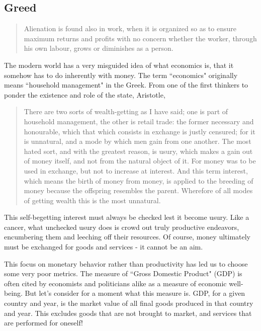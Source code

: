 \documentclass[letterpaper]{article}
\begin{document}
\subsection{Greed}

\begin{quote}
  Alienation is found also in work, when it is organized so as to ensure maximum returns and profits with no concern whether the worker, through his own labour, grows or diminishes as a person.
\end{quote}

The modern world has a very misguided idea of what economics is, that it somehow has to do inherently with money. The term ``economics" originally means ``household management" in the Greek. From one of the first thinkers to ponder the existence and role of the state, Aristotle,

\begin{quote}
  There are two sorts of wealth-getting as I have said; one is part of household management, the other is retail trade: the former necessary and honourable, which that which consists in exchange is justly censured; for it is unnatural, and a mode by which men gain from one another. The most hated sort, and with the greatest reason, is usury, which makes a gain out of money itself, and not from the natural object of it. For money was to be used in exchange, but not to increase at interest. And this term interest, which means the birth of money from money, is applied to the breeding of money because the offspring resembles the parent. Wherefore of all modes of getting wealth this is the most unnatural.
\end{quote}

This self-begetting interest must always be checked lest it become usury. Like a cancer, what unchecked usury does is crowd out truly productive endeavors, encumbering them and leeching off their resources. Of course, money ultimately must be exchanged for goods and services - it cannot be an aim.

This focus on monetary behavior rather than productivity has led us to choose some very poor metrics. The measure of ``Gross Domestic Product" (GDP) is often cited by economists and politicians alike as a measure of economic well-being. But let's consider for a moment what this measure is. GDP, for a given country and year, is the market value of all final goods produced in that country and year. This excludes goods that are not brought to market, and services that are performed for oneself!
\end{document}
